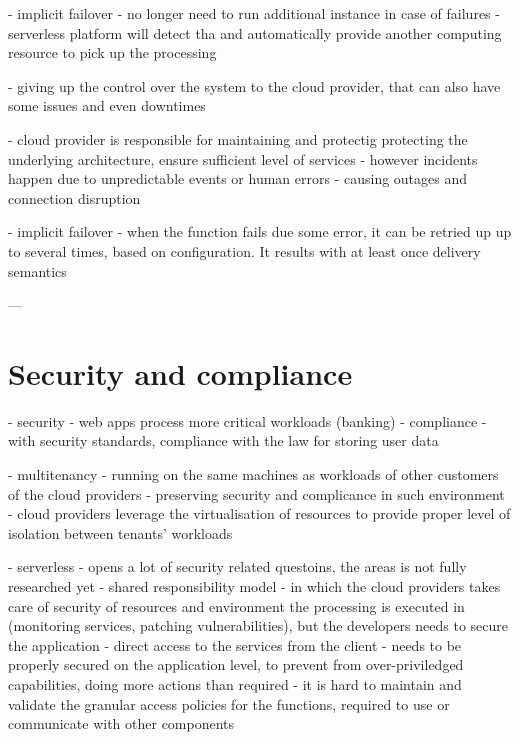 \label{chapter:serverless-development-opportunities}
- implicit failover - no longer need to run additional instance in case of failures - serverless platform will detect tha and automatically provide another computing resource to pick up the processing

\label{chapter:serverless-vendor-dependence}
- giving up the control over the system to the cloud provider, that can also have some issues and even downtimes

\label{chapter:serverless-suitability-vendor-dependence}
- cloud provider is responsible for maintaining and protectig protecting the underlying architecture, ensure sufficient level of services - however incidents happen due to unpredictable events or human errors - causing outages and connection disruption

\label{chapter:serverless-suitability-operation-types}
- implicit failover - when the function fails due some error, it can be retried up up to several times, based on configuration. It results with at least once delivery semantics

---

\section{Security and compliance}

- security - web apps process more critical workloads (banking)
- compliance - with security standards, compliance with the law for storing user data

\label{chapter:serverless-multitenancy-problem}
- multitenancy - running on the same machines as workloads of other customers of the cloud providers - preserving security and complicance in such environment - cloud providers leverage the virtualisation of resources to provide proper level of isolation between tenants' workloads

\label{chapter:serverless-security-concerns}
- serverless - opens a lot of security related questoins, the areas is not fully researched yet
- shared responsibility model - in which the cloud providers takes care of security of resources and environment the processing is executed in (monitoring services, patching vulnerabilities), but the developers needs to secure the application
- direct access to the services from the client - needs to be properly secured on the application level, to prevent from over-priviledged capabilities, doing more actions than required
- it is hard to maintain and validate the granular access policies for the functions, required to use or communicate with other components

